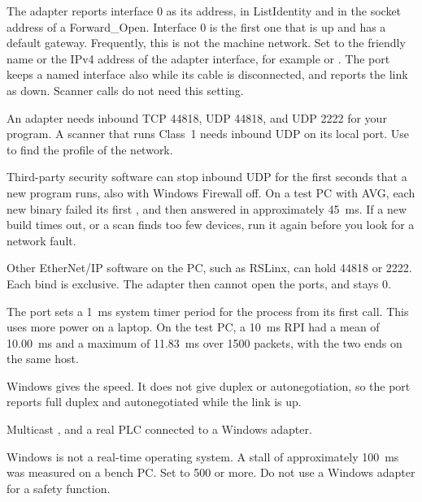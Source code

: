 \begin{description}[font=\sffamily\bfseries\color{steel}]
  \item[Select the interface on a PC with more than one.] The adapter reports
        interface 0 as its address, in ListIdentity and in the \OT{} socket
        address of a Forward\_Open. Interface 0 is the first one that is up
        and has a default gateway. Frequently, this is not the machine
        network. Set  to the friendly name or the IPv4 address
        of the adapter interface, for example  or
        . The port keeps a named interface also
        while its cable is disconnected, and reports the link as down. Scanner
        calls do not need this setting.
  \item[Firewall.] An adapter needs inbound TCP 44818, UDP 44818, and UDP
        2222 for your program. A scanner that runs Class~1 needs inbound UDP
        on its local port. Use  to find the
        profile of the network.
  \item[A new executable can lose its first replies.] Third-party security
        software can stop inbound UDP for the first seconds that a new
        program runs, also with Windows Firewall off. On a test PC with AVG,
        each new binary failed its first , and then
        answered in approximately 45~ms. If a new build times out, or a scan
        finds too few devices, run it again before you look for a network
        fault.
  \item[Busy ports.] Other EtherNet/IP software on the PC, such as RSLinx,
        can hold 44818 or 2222. Each bind is exclusive. The adapter then
        cannot open the ports, and  stays 0.
  \item[Timing.] The port sets a 1~ms system timer period for the process
        from its first call. This uses more power on a laptop. On the test PC,
        a 10~ms RPI had a mean of 10.00~ms and a maximum of 11.83~ms over
        \num{1500} packets, with the two ends on the same host.
  \item[Link report.] Windows gives the speed. It does not give duplex or
        autonegotiation, so the port reports full duplex and autonegotiated
        while the link is up.
  \item[Not tested.] Multicast \TO, and a real PLC connected to a Windows
        adapter.
\end{description}

\begin{warning}
Windows is not a real-time operating system. A stall of approximately 100~ms
was measured on a bench PC. Set  to 500 or more. Do
not use a Windows adapter for a safety function.
\end{warning}
